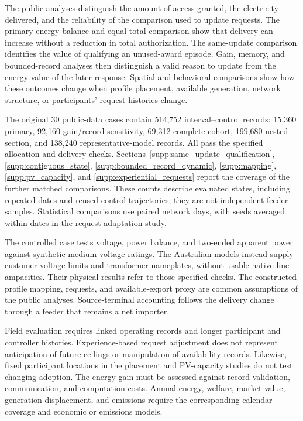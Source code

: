 \documentclass[11pt]{article}
\begin{document}
The public analyses distinguish the amount of access granted, the electricity
delivered, and the reliability of the comparison used to update requests.
The primary energy balance and equal-total comparison show that delivery
can increase without a reduction in total authorization. The same-update
comparison identifies the value of qualifying an unused-award episode.
Gain, memory, and bounded-record analyses then distinguish a valid reason to
update from the energy value of the later response. Spatial and behavioral
comparisons show how these outcomes change when profile placement, available
generation, network structure, or participants' request histories change.

The original 30 public-data cases contain 514,752 interval--control records:
15,360 primary, 92,160 gain/record-sensitivity, 69,312 complete-cohort,
199,680 nested-section, and 138,240 representative-model records. All pass the
specified allocation and delivery checks. Sections~\ref{supp:same_update_qualification},
\ref{supp:contiguous_state}, \ref{supp:bounded_record_dynamic},
\ref{supp:mapping}, \ref{supp:pv_capacity}, and \ref{supp:experiential_requests}
report the coverage of the further matched comparisons. These counts describe
evaluated states, including repeated dates and reused control trajectories;
they are not independent feeder samples. Statistical comparisons use paired
network days, with seeds averaged within dates in the request-adaptation study.

The controlled case tests voltage, power balance, and two-ended apparent power
against synthetic medium-voltage ratings. The Australian models instead supply
customer-voltage limits and transformer nameplates, without usable native line
ampacities. Their physical results refer to those specified checks. The
constructed profile mapping, requests, and available-export proxy are common
assumptions of the public analyses. Source-terminal accounting follows the
delivery change through a feeder that remains a net importer.

Field evaluation requires linked operating records and longer participant and
controller histories. Experience-based request adjustment does not represent
anticipation of future ceilings or manipulation of availability records.
Likewise, fixed participant locations in the placement and PV-capacity studies
do not test changing adoption. The energy gain must be assessed against record
validation, communication, and computation costs. Annual energy, welfare,
market value, generation displacement, and emissions require the corresponding
calendar coverage and economic or emissions models.


\begingroup
\footnotesize


\endgroup
\end{document}
